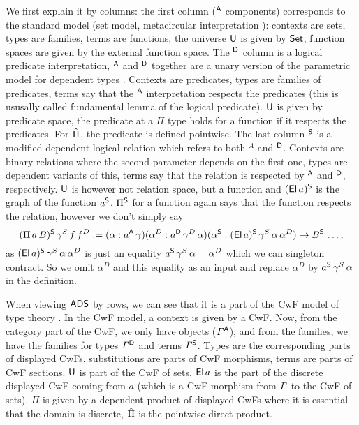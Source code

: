 \documentclass[a4paper,UKenglish,cleveref, autoref]{lipics-v2019}
\begin{document}
We first explain it by columns: the first column ($^\A$ components)
corresponds to the standard model (set model, metacircular
interpretation \cite{ttintt}): contexts are sets, types are families,
terms are functions, the universe $\U$ is given by $\Set$, function
spaces are given by the external function space. The $^\D$ column is a
logical predicate interpretation, $^\A$ and $^\D$ together are a unary
version of the parametric model for dependent types
\cite{10.1145/2535838.2535852}. Contexts are predicates, types are
families of predicates, terms say that the $^\A$ interpretation
respects the predicates (this is ususally called fundamental lemma of
the logical predicate). $\U$ is given by predicate space, the
predicate at a $\Pi$ type holds for a function if it respects the
predicates. For $\Pim$, the predicate is defined pointwise. The last
column $^\S$ is a modified dependent logical relation which refers to
both $^A$ and $^\D$. Contexts are binary relations where the second
parameter depends on the first one, types are dependent variants of
this, terms say that the relation is respected by $^\A$ and $^\D$,
respectively. $\U$ is however not relation space, but a function and
$(\El\,a)^\S$ is the graph of the function $a^\S$. $\Pi^\S$ for a
function again says that the function respects the relation, however
we don't simply say
\[
  (\Pi\,a\,B)^\S\,\gamma^S\,f\,f^D := (\alpha:a^\A\,\gamma)(\alpha^D:a^\D\,\gamma^D\,\alpha)(\alpha^\S:(\El\,a)^\S\,\gamma^S\,\alpha\,\alpha^D)\ra B^\S\,\dots,
\]
as $(\El\,a)^\S\,\gamma^S\,\alpha\,\alpha^D$ is just an equality
$a^\S\,\gamma^S\,\alpha = \alpha^D$ which we can singleton
contract. So we omit $\alpha^D$ and this equality as an input and
replace $\alpha^D$ by $a^\S\,\gamma^S\,\alpha$ in the definition.

When viewing $\ADS$ by rows, we can see that it is a part of the CwF
model of type theory \cite[Section
7.4]{Kaposi:2019:CQI:3302515.3290315}. In the CwF model, a context is
given by a CwF. Now, from the category part of the CwF, we only have
objects ($\GG^\A$), and from the families, we have the families for
types $\GG^\D$ and terms $\GG^\S$. Types are the corresponding
parts of displayed CwFs, substitutions are parts of CwF morphisms,
terms are parts of CwF sections. $\U$ is part of the CwF of sets,
$\El\,a$ is the part of the discrete displayed CwF coming from $a$
(which is a CwF-morphism from $\GG$ to the CwF of sets). $\Pi$ is
given by a dependent product of displayed CwFs where it is essential
that the domain is discrete, $\Pim$ is the pointwise direct product.
\end{document}
